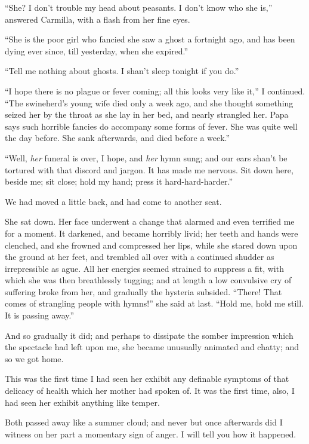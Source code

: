 \documentclass[11pt,twoside,makeidx,hidelinks,]{memoir}
\begin{document}
``She? I don't trouble my head about peasants. I don't know who she is,''
answered Carmilla, with a flash from her fine eyes.

``She is the poor girl who fancied she saw a ghost a fortnight ago, and
has been dying ever since, till yesterday, when she expired.''

``Tell me nothing about ghosts. I shan't sleep tonight if you do.''

``I hope there is no plague or fever coming; all this looks very like
it,'' I continued. ``The swineherd's young wife died only a week ago, and
she thought something seized her by the throat as she lay in her bed,
and nearly strangled her. Papa says such horrible fancies do accompany
some forms of fever. She was quite well the day before. She sank
afterwards, and died before a week.''

``Well, \emph{her} funeral is over, I hope, and \emph{her} hymn sung; and our ears
shan't be tortured with that discord and jargon. It has made me nervous.
Sit down here, beside me; sit close; hold my hand; press it
hard-hard-harder.''

We had moved a little back, and had come to another seat.

She sat down. Her face underwent a change that alarmed and even
terrified me for a moment. It darkened, and became horribly livid; her
teeth and hands were clenched, and she frowned and compressed her lips,
while she stared down upon the ground at her feet, and trembled all over
with a continued shudder as irrepressible as ague. All her energies
seemed strained to suppress a fit, with which she was then breathlessly
tugging; and at length a low convulsive cry of suffering broke from her,
and gradually the hysteria subsided. ``There! That comes of strangling
people with hymns!'' she said at last. ``Hold me, hold me still. It is
passing away.''

And so gradually it did; and perhaps to dissipate the somber impression
which the spectacle had left upon me, she became unusually animated and
chatty; and so we got home.

This was the first time I had seen her exhibit any definable symptoms of
that delicacy of health which her mother had spoken of. It was the first
time, also, I had seen her exhibit anything like temper.

Both passed away like a summer cloud; and never but once afterwards did
I witness on her part a momentary sign of anger. I will tell you how
it happened.
\end{document}

